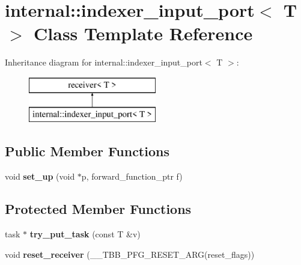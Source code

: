 \hypertarget{classinternal_1_1indexer__input__port}{}\section{internal\+:\+:indexer\+\_\+input\+\_\+port$<$ T $>$ Class Template Reference}
\label{classinternal_1_1indexer__input__port}
Inheritance diagram for internal\+:\+:indexer\+\_\+input\+\_\+port$<$ T $>$\+:\begin{figure}[H]
\begin{center}
\leavevmode
\includegraphics[height=2.000000cm]{classinternal_1_1indexer__input__port}
\end{center}
\end{figure}
\subsection*{Public Member Functions}
\begin{DoxyCompactItemize}
\item 
\hypertarget{classinternal_1_1indexer__input__port_a1ee267dc40ec01c3eed9d466af742234}{}void {\bfseries set\+\_\+up} (void $\ast$p, forward\+\_\+function\+\_\+ptr f)\label{classinternal_1_1indexer__input__port_a1ee267dc40ec01c3eed9d466af742234}

\end{DoxyCompactItemize}
\subsection*{Protected Member Functions}
\begin{DoxyCompactItemize}
\item 
\hypertarget{classinternal_1_1indexer__input__port_a4180cafa3b1a1850829b1deaf233ba93}{}task $\ast$ {\bfseries try\+\_\+put\+\_\+task} (const T \&v)\label{classinternal_1_1indexer__input__port_a4180cafa3b1a1850829b1deaf233ba93}

\item 
\hypertarget{classinternal_1_1indexer__input__port_a59b777edcf130392e20381176824e701}{}void {\bfseries reset\+\_\+receiver} (\+\_\+\+\_\+\+T\+B\+B\+\_\+\+P\+F\+G\+\_\+\+R\+E\+S\+E\+T\+\_\+\+A\+R\+G(reset\+\_\+flags))\label{classinternal_1_1indexer__input__port_a59b777edcf130392e20381176824e701}

\end{DoxyCompactItemize}
